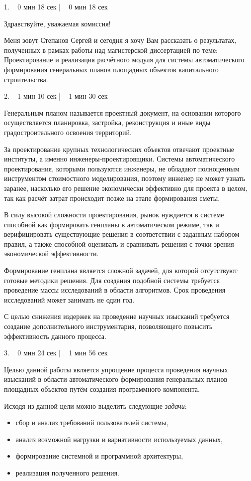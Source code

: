 \documentclass[a4paper,14pt]{extarticle}
\begin{document}
    1. ~ 0 мин 18 сек | ~ 0 мин 18 сек

    Здравствуйте, уважаемая комиссия!

    Меня зовут Степанов Сергей и сегодня я хочу Вам рассказать о результатах,
    полученных в рамках работы над магистерской диссертацией по теме:
    Проектирование и реализация расчётного модуля для системы автоматического формирования
    генеральных планов площадных объектов капитального строительства.

    2. ~ 1 мин 10 сек | ~ 1 мин 30 сек

    Генеральным планом называется
    проектный документ, на основании которого осуществляется планировка,
    застройка, реконструкция и иные виды градостроительного освоения территорий.

    За проектирование крупных технологических объектов отвечают проектные институты,
    а именно инженеры-проектировщики. Системы автоматического проектирования, которыми
    пользуются инженеры, не обладают полноценным инструментом стоимостного моделирования,
    поэтому инженер не может узнать заранее,
    насколько его решение экономически эффективно для проекта в целом,
    так как расчёт затрат происходит позже на этапе формирования сметы.

    В силу высокой сложности проектирования,
    рынок нуждается в системе способной как формировать генпланы в автоматическом режиме,
    так и верифицировать существующие решения в соответствии с заданным набором правил,
    а также способной оценивать и сравнивать решения с точки зрения экономической эффективности.

    Формирование генплана является сложной задачей, для которой отсутствуют готовые методики решения.
    Для создания подобной системы требуется проведение массы исследований в области алгоритмов.
    Срок проведения исследований может занимать не один год.

    С целью снижения издержек на проведение научных изысканий требуется создание дополнительного инструментария,
    позволяющего повысить эффективность данного процесса.

    3. ~ 0 мин 24 сек | ~ 1 мин 56 сек

    Целью данной работы является
    упрощение процесса проведения научных изысканий
    в области автоматического формирования генеральных планов площадных объектов
    путём создания программного компонента.

    Исходя из данной цели можно выделить следующие \textit{задачи}:
    \begin{itemize}
        \item сбор и анализ требований пользователей системы,
        \item анализ возможной нагрузки и вариативности используемых данных,
        \item формирование системной и программной архитектуры,
        \item реализация полученного решения.
    \end{itemize}
\end{document}
